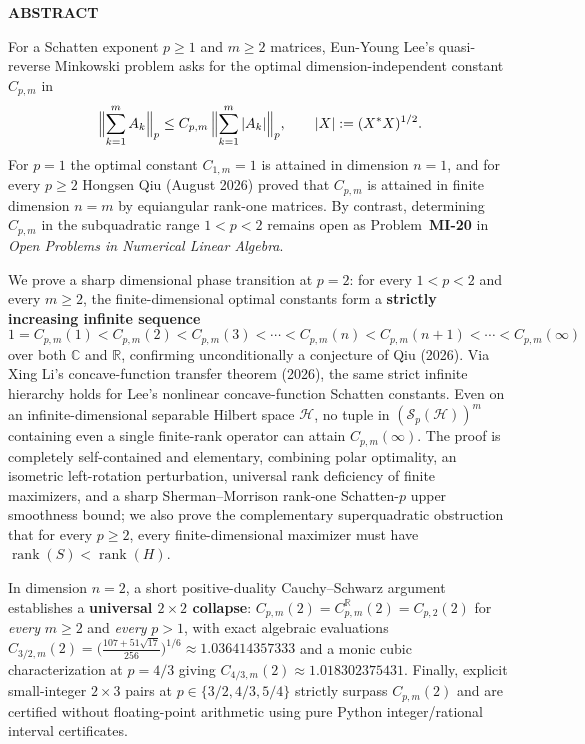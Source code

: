 \documentclass[10pt,letterpaper]{article}
\newcommand{\C}{\mathbb{C}}
\newcommand{\R}{\mathbb{R}}
\newcommand{\Hilb}{\mathcal{H}}
\newcommand{\Sp}{\mathcal{S}_p}
\newcommand{\rank}{\operatorname{rank}}
\begin{document}
\begin{tcolorbox}[abstractbox]
{\sffamily\footnotesize\bfseries\color{accentblue}ABSTRACT}\par\vspace{2pt}
For a Schatten exponent $p \ge 1$ and $m \ge 2$ matrices, Eun-Young Lee's quasi-reverse Minkowski problem asks for the optimal dimension-independent constant $C_{p,m}$ in
\[
  \Bigl\|\sum_{k=1}^m A_k\Bigr\|_p \le C_{p,m}\,\Bigl\|\sum_{k=1}^m |A_k|\Bigr\|_p,
  \qquad |X| := (X^* X)^{1/2}.
\]
For $p = 1$ the optimal constant $C_{1,m} = 1$ is attained in dimension $n = 1$, and for every $p \ge 2$ Hongsen Qiu (August 2026) proved that $C_{p,m}$ is attained in finite dimension $n = m$ by equiangular rank-one matrices. By contrast, determining $C_{p,m}$ in the subquadratic range $1 < p < 2$ remains open as Problem~\textbf{MI-20} in \emph{Open Problems in Numerical Linear Algebra}.

We prove a sharp dimensional phase transition at $p = 2$: for every $1 < p < 2$ and every $m \ge 2$, the finite-dimensional optimal constants form a \textbf{strictly increasing infinite sequence}
\[
  1 = C_{p,m}(1) < C_{p,m}(2) < C_{p,m}(3) < \cdots < C_{p,m}(n) < C_{p,m}(n+1) < \cdots < C_{p,m}(\infty)
\]
over both $\C$ and $\R$, confirming unconditionally a conjecture of Qiu (2026). Via Xing Li's concave-function transfer theorem (2026), the same strict infinite hierarchy holds for Lee's nonlinear concave-function Schatten constants. Even on an infinite-dimensional separable Hilbert space $\Hilb$, no tuple in $(\Sp(\Hilb))^m$ containing even a single finite-rank operator can attain $C_{p,m}(\infty)$. The proof is completely self-contained and elementary, combining polar optimality, an isometric left-rotation perturbation, universal rank deficiency of finite maximizers, and a sharp Sherman--Morrison rank-one Schatten-$p$ upper smoothness bound; we also prove the complementary superquadratic obstruction that for every $p \ge 2$, every finite-dimensional maximizer must have $\rank(S) < \rank(H)$.

In dimension $n = 2$, a short positive-duality Cauchy--Schwarz argument establishes a \textbf{universal $2\times 2$ collapse}: $C_{p,m}(2) = C_{p,m}^{\R}(2) = C_{p,2}(2)$ for \emph{every} $m \ge 2$ and \emph{every} $p > 1$, with exact algebraic evaluations $C_{3/2,m}(2) = \bigl(\frac{107+51\sqrt{17}}{256}\bigr)^{1/6} \approx 1.036414357333$ and a monic cubic characterization at $p = 4/3$ giving $C_{4/3,m}(2) \approx 1.018302375431$. Finally, explicit small-integer $2\times 3$ pairs at $p \in \{3/2, 4/3, 5/4\}$ strictly surpass $C_{p,m}(2)$ and are certified without floating-point arithmetic using pure Python integer/rational interval certificates.
\end{tcolorbox}
\end{document}
